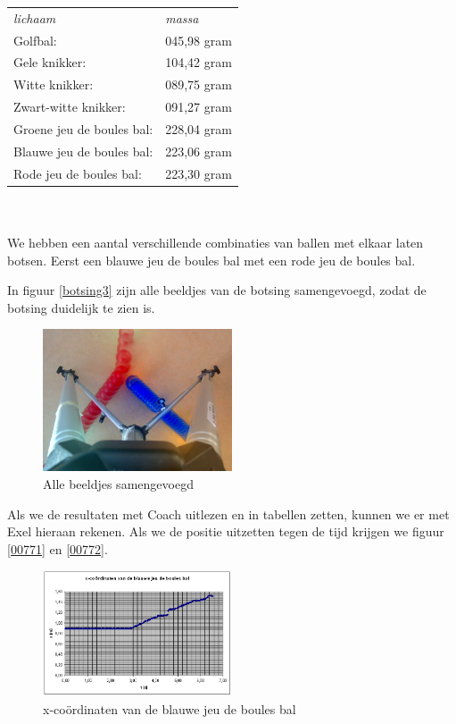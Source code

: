 \documentclass[12pt,a4paper]{article}
\begin{document}
	\begin{tabular}{|  l l |}
		\hline 
			\emph{lichaam} &\emph{massa}\\
			Golfbal: &045,98 gram\\
			Gele knikker: &104,42 gram\\
			Witte knikker: &089,75 gram\\
			Zwart-witte knikker: &091,27 gram\\
			Groene jeu de boules bal: &228,04 gram\\
			Blauwe jeu de boules bal: &223,06 gram\\
			Rode jeu de boules bal: &223,30 gram\\
		\hline 
	\end{tabular}
	\\
	\\We hebben een aantal verschillende combinaties van ballen met elkaar laten botsen. Eerst een blauwe jeu de boules bal met een rode jeu de boules bal.

	In figuur \eqref{botsing3} zijn alle beeldjes van de botsing samengevoegd, zodat de botsing duidelijk te zien is.
	
	\begin{figure}[H]
		\centerline{\includegraphics[width=0.5\textwidth]{Plaatjes/botsing3.jpg}}
		\caption{Alle beeldjes samengevoegd}
		\label{botsing3}
	\end{figure}

	Als we de resultaten met Coach uitlezen en in tabellen zetten, kunnen we er met Exel hieraan rekenen. Als we de positie uitzetten tegen de tijd krijgen we figuur \eqref{00771} en \eqref{00772}.

	\begin{figure}[H]
		\centerline{\includegraphics[width=0.5\textwidth]{Plaatjes/00771.png}}
		\caption{x-co\"{o}rdinaten van de blauwe jeu de boules bal}
		\label{00771}
	\end{figure}
	
\end{document}
